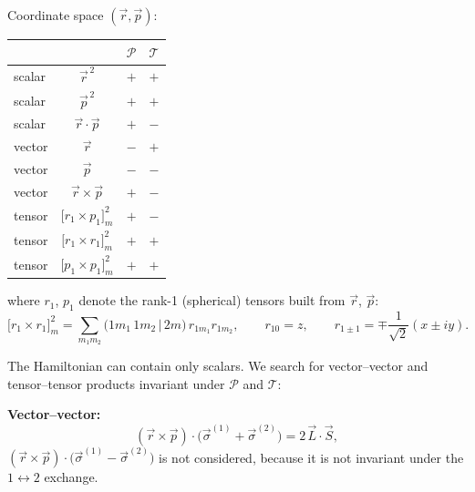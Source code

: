 \documentclass[11pt,a4paper]{article}
\begin{document}
Coordinate space $(\vec r,\vec p)$:
\begin{center}
\renewcommand{\arraystretch}{1.3}
\begin{tabular}{l c c c}
\hline
 & & $\mathcal P$ & $\mathcal T$ \\
\hline
scalar & $\vec r^{\,2}$ & $+$ & $+$ \\
scalar & $\vec p^{\,2}$ & $+$ & $+$ \\
scalar & $\vec r\cdot\vec p$ & $+$ & $-$ \\
vector & $\vec r$ & $-$ & $+$ \\
vector & $\vec p$ & $-$ & $-$ \\
vector & $\vec r\times\vec p$ & $+$ & $-$ \\
tensor & $\big[r_1\times p_1\big]^2_m$ & $+$ & $-$ \\
tensor & $\big[r_1\times r_1\big]^2_m$ & $+$ & $+$ \\
tensor & $\big[p_1\times p_1\big]^2_m$ & $+$ & $+$ \\
\hline
\end{tabular}
\end{center}
where $r_1$, $p_1$ denote the rank-1 (spherical) tensors built from $\vec r$, $\vec p$:
\[
\big[r_1\times r_1\big]^2_m=\sum_{m_1m_2}\big(1m_1\,1m_2\,|\,2m\big)\,r_{1m_1}r_{1m_2},
\qquad
r_{10}=z,\qquad r_{1\pm1}=\mp\frac{1}{\sqrt2}(x\pm iy).
\]

The Hamiltonian can contain only scalars. We search for vector--vector and
tensor--tensor products invariant under $\mathcal P$ and $\mathcal T$:

\textbf{Vector--vector:}
\[
(\vec r\times\vec p)\cdot\big(\vec\sigma^{(1)}+\vec\sigma^{(2)}\big)=2\,\vec L\cdot\vec S ,
\]
$(\vec r\times\vec p)\cdot\big(\vec\sigma^{(1)}-\vec\sigma^{(2)}\big)$ is not considered, because it is not  invariant under the $1\leftrightarrow2$ exchange.
\end{document}

